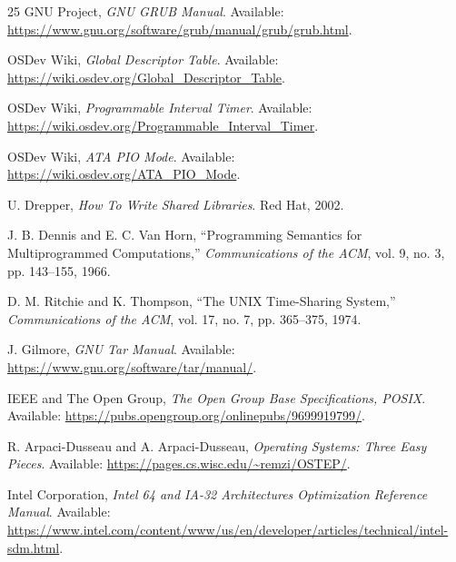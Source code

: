 \documentclass[conference]{IEEEtran}
\begin{document}
\begin{thebibliography}{25}
GNU Project,
\emph{GNU GRUB Manual}.
Available: \url{https://www.gnu.org/software/grub/manual/grub/grub.html}.

OSDev Wiki,
\emph{Global Descriptor Table}.
Available: \url{https://wiki.osdev.org/Global_Descriptor_Table}.

OSDev Wiki,
\emph{Programmable Interval Timer}.
Available: \url{https://wiki.osdev.org/Programmable_Interval_Timer}.

OSDev Wiki,
\emph{ATA PIO Mode}.
Available: \url{https://wiki.osdev.org/ATA_PIO_Mode}.

U. Drepper,
\emph{How To Write Shared Libraries}.
Red Hat, 2002.

J. B. Dennis and E. C. Van Horn,
``Programming Semantics for Multiprogrammed Computations,''
\emph{Communications of the ACM},
vol. 9, no. 3, pp. 143--155, 1966.

D. M. Ritchie and K. Thompson,
``The UNIX Time-Sharing System,''
\emph{Communications of the ACM},
vol. 17, no. 7, pp. 365--375, 1974.

J. Gilmore,
\emph{GNU Tar Manual}.
Available: \url{https://www.gnu.org/software/tar/manual/}.

IEEE and The Open Group,
\emph{The Open Group Base Specifications, POSIX}.
Available: \url{https://pubs.opengroup.org/onlinepubs/9699919799/}.

R. Arpaci-Dusseau and A. Arpaci-Dusseau,
\emph{Operating Systems: Three Easy Pieces}.
Available: \url{https://pages.cs.wisc.edu/~remzi/OSTEP/}.

Intel Corporation,
\emph{Intel 64 and IA-32 Architectures Optimization Reference Manual}.
Available: \url{https://www.intel.com/content/www/us/en/developer/articles/technical/intel-sdm.html}.

\end{thebibliography}
\end{document}
